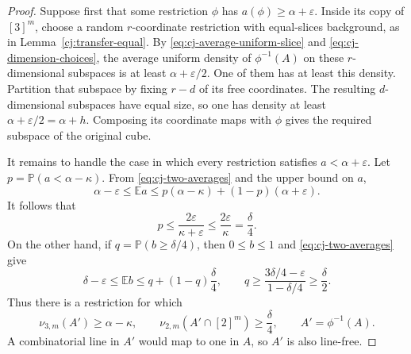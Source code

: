 \documentclass[11pt]{amsart}
\theoremstyle{definition}
\theoremstyle{remark}
\numberwithin{equation}{section}
\begin{document}
\begin{proof}
Suppose first that some restriction $\phi$ has
$a(\phi)\ge\alpha+\varepsilon$.  Inside its copy of $[3]^m$,
choose a random $r$-coordinate restriction with equal-slices
background, as in Lemma~\ref{cj:transfer-equal}.  By
\eqref{eq:cj-average-uniform-slice} and
\eqref{eq:cj-dimension-choices}, the average uniform density of
$\phi^{-1}(A)$ on these $r$-dimensional subspaces is at least
$\alpha+\varepsilon/2$.  One of them has at least this density.
Partition that subspace by fixing $r-d$ of its free coordinates.
The resulting $d$-dimensional subspaces have equal size, so one
has density at least $\alpha+\varepsilon/2=\alpha+h$.
Composing its coordinate maps with $\phi$ gives the required
subspace of the original cube.

It remains to handle the case in which every restriction satisfies
$a<\alpha+\varepsilon$.  Let
$p=\mathbb P(a<\alpha-\kappa)$.  From
\eqref{eq:cj-two-averages} and the upper bound on $a$,
\[
 \alpha-\varepsilon
 \le\mathbb E a
 \le p(\alpha-\kappa)+(1-p)(\alpha+\varepsilon).
\]
It follows that
\[
 p\le\frac{2\varepsilon}{\kappa+\varepsilon}
      \le\frac{2\varepsilon}{\kappa}=\frac\delta4.
\]
On the other hand, if $q=\mathbb P(b\ge\delta/4)$, then
$0\le b\le1$ and \eqref{eq:cj-two-averages} give
\[
 \delta-\varepsilon
 \le\mathbb E b\le q+(1-q)\frac\delta4,
 \qquad
 q\ge\frac{3\delta/4-\varepsilon}{1-\delta/4}
       \ge\frac\delta2.
\]
Thus there is a restriction for which
\begin{equation}\label{eq:cj-good-face}
 \nu_{3,m}(A')\ge\alpha-\kappa,
 \qquad
 \nu_{2,m}(A'\cap[2]^m)\ge\frac\delta4,
 \qquad A'=\phi^{-1}(A).
\end{equation}
A combinatorial line in $A'$ would map to one in $A$, so $A'$ is
also line-free.


\end{proof}
\end{document}
